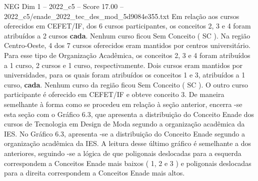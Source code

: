 \begin{textsample}{NEG Dim 1 – 2022\_c5 – Score 17.00 – 2022\_c5/enade\_2022\_tec\_des\_mod\_5d9084e355.txt}
Em relação aos cursos oferecidos em CEFET/IF, dos 6 cursos participantes, os conceitos 2, 3 e 4 foram atribuídos a 2 cursos \textbf{cada}.
Nenhum curso ficou Sem Conceito ( SC ).
Na região Centro-Oeste, 4 dos 7 cursos oferecidos eram mantidos por centros universitário.
Para esse tipo de Organização Acadêmica, os conceitos 2, 3 e 4 foram atribuídos a 1 curso, 2 cursos e 1 curso, respectivamente.
Dois cursos eram mantidos por universidades, para os quais foram atribuídos os conceitos 1 e 3, atribuídos a 1 curso, \textbf{cada}.
Nenhum curso da região ficou Sem Conceito ( SC ).
O outro curso participante é oferecido em CEFET/IF e obteve conceito 3.
De maneira semelhante à forma como se procedeu em relação à seção anterior, encerra -se esta seção com o Gráfico 6.3, que apresenta a distribuição do Conceito Enade dos cursos de Tecnologia em Design de Moda segundo a organização acadêmica da IES.
No Gráfico 6.3, apresenta -se a distribuição do Conceito Enade segundo a organização acadêmica da IES.
A leitura desse último gráfico é semelhante a dos anteriores, seguindo -se a lógica de que poligonais deslocadas para a esquerda correspondem a Conceitos Enade mais baixos ( 1, 2 e 3 ) e poligonais deslocadas para a direita correspondem a Conceitos Enade mais altos.

\end{textsample}
